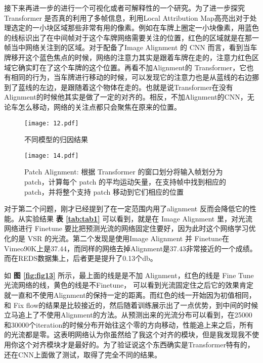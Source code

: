 接下来再进一步的进行一个可视化或者可解释性的一个研究。为了进一步探究 Transformer 是否真的利用了多帧信息，利用Local Attribution Map高亮出对于处理选定的一小块区域那些非常有用的像素。例如在车牌上圈定一小块像素，用蓝色的线标识出了在中间帧对于这个车牌网络需要关注的位置，红色的区域就是在那一帧当中网络关注到的区域。对于配备了Image Alignment 的 CNN 而言，看到当车牌移开这个蓝色焦点的时候，网络的注意力其实是跟着车牌在走的，注意力红色区域它确实盯在了这个车牌的这个位置。再看不加Alignment的 Transformer，它也有相同的行为，当车牌进行移动的时候，可以发现它的注意力也是从蓝线的右边挪到了蓝线的左边，是跟随着这个物体在走的。也就是说Transformer在没有Alignment的时候他其实是做了一定的对齐的。相反，不加Alignment的CNN，无论车怎么移动，网络的关注点都只会聚焦在原来的位置。

\begin{figure*}[!tbp]
	\centering
	\texttt{[image: 12.pdf]}
	\caption{不同模型的归因结果}
	\label{fig:fig12}
\end{figure*}

\begin{figure*}[!tbp]
	\centering
	\texttt{[image: 14.pdf]}
	\caption{Patch Alignment: 根据 Transformer 的窗口划分将输入帧划分为 patch，计算每个 patch 的平均运动矢量，在支持帧中找到相应的 patch，并将整个支持 patch 移动到它们相应的位置}
	\label{fig:fig14}
\end{figure*}

对于第二个问题，刚才已经提到了在一定范围内用了alignment 反而会降低它的性能。从实验结果 \textbf{表 \ref{tab:tab1}} 可以看到，就是在 Image Alignment 里，对光流网络进行 Finetune 要比把预测光流的网络固定住要好，因为此时这个网络学习优化的是 VSR 的光流。第二个发现是使用Image Alignment 并 Finetune在Vimeo90K上是37.44，而同样的网络去掉Alignment是37.43非常接近的一个成绩。而在REDS数据集上，后者更是提升了0.13个db。



如 \textbf{图 \ref{fig:fig13}} 所示，最上面的线是是不加 Alignment，红色的线是 Fine Tune 光流网络的线，黄色的线是不Finetune， 可以看到光流固定住之后它的效果肯定就一直和不使用Alignment的保持一定的距离。而红色的线一开始因为初值相同，和 Fix flow的结果是比较接近的，然后随着训练展示出了一点优势，到中间的时候立马追上了不使用Alignment的方法。从预测出来的光流分布可以看到，在25000和30000个iteration的时候分布开始往这个零的方向移动，性能追上来之后，所有的光流都是零。这表明网络认为你虽然给了我这个对齐的模块，但是我发现我不使用你这个对齐模块才是最好的。为了验证说这个东西确实是Transformer特有的，还在CNN上面做了测试，取得了完全不同的结果。


